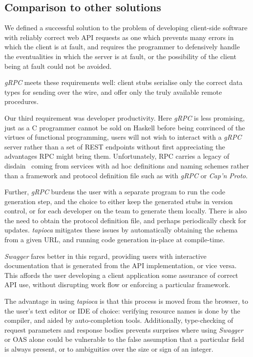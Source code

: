 \subsection{Comparison to other solutions} \label{concl:comparison}

We defined a successful solution to the problem of developing client-side software with reliably correct web API requests  as one which prevents many errors in which the client is at fault, and requires the programmer to defensively handle the eventualities in which the server is at fault, or the possibility of the client being at fault could not be avoided. 

\emph{gRPC} meets these requirements well: client stubs serialise only the correct data types for sending over the wire, and offer only the truly available remote procedures. 

Our third requirement was developer productivity.  Here \emph{gRPC} is less promising, just as a C programmer cannot be sold on Haskell before being convinced of the virtues of functional programming, users will not wish to interact with a \emph{gRPC} server rather than a set of REST endpoints without first appreciating the advantages RPC might bring them. Unfortunately, RPC carries a legacy of disdain~\cite{why_you_prefer_rest_rpc} coming from services with ad hoc definitions and naming schemes rather than a framework and protocol definition file such as with \emph{gRPC} or \emph{Cap'n Proto}.

Further, \emph{gRPC} burdens the user with a separate program to run the code generation step, and the choice to either keep the generated stubs in version control, or for each developer on the team to generate them locally. There is also the need to obtain the protocol definition file, and perhaps periodically check for updates. \emph{tapioca} mitigates these issues by automatically obtaining the schema from a given URL, and running code generation in-place at compile-time.

\emph{Swagger} fares better in this regard, providing users with interactive documentation that is generated from the API implementation, or vice versa. This affords the user developing a client application some assurance of correct API use, without disrupting work flow or enforcing a particular framework.

The advantage in using \emph{tapioca} is that this process is moved from the browser, to the user's text editor or IDE of choice: verifying resource names is done by the compiler, and aided by auto-completion tools. Additionally, type-checking of request parameters and response bodies prevents surprises where using \emph{Swagger} or OAS alone could be vulnerable to the false assumption that a particular field is always present, or to ambiguities over the size or sign of an integer.